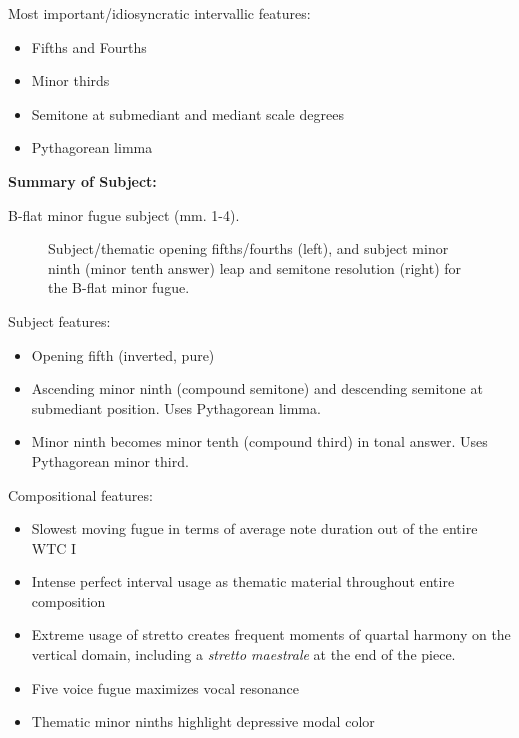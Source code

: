 Most important/idiosyncratic intervallic features:

\begin{itemize}
\tightlist
\item
  Fifths and Fourths
\item
  Minor thirds
\item
  Semitone at submediant and mediant scale degrees
\item
  Pythagorean limma
\end{itemize}

\textbf{Summary of Subject:}



\begin{Example}[H]
\vspace{1.5em}
    \centering
    \caption{ B-flat minor fugue subject (mm. 1-4). }
\end{Example}    


\begin{figure}[H]
\vspace{1.5em}
    \centering
    \caption[Subject/thematic opening fifths/fourths, and subject minor ninth leap and semitone resolution for the B-flat minor fugue. ]{Subject/thematic opening fifths/fourths (left), and subject minor ninth (minor tenth answer) leap and semitone resolution (right) for the B-flat minor fugue.}
\end{figure}    Subject features:

\begin{itemize}
\tightlist
\item
  Opening fifth (inverted, pure)
\item
  Ascending minor ninth (compound semitone) and descending semitone at
  submediant position. Uses Pythagorean limma.
\item
  Minor ninth becomes minor tenth (compound third) in tonal answer. Uses
  Pythagorean minor third.
\end{itemize}

Compositional features:

\begin{itemize}
\tightlist
\item
  Slowest moving fugue in terms of average note duration out of the
  entire WTC I
\item
  Intense perfect interval usage as thematic material throughout entire
  composition
\item
  Extreme usage of stretto creates frequent moments of quartal harmony
  on the vertical domain, including a \emph{stretto maestrale} at the
  end of the piece.
\item
  Five voice fugue maximizes vocal resonance
\item
  Thematic minor ninths highlight depressive modal color
\end{itemize}

